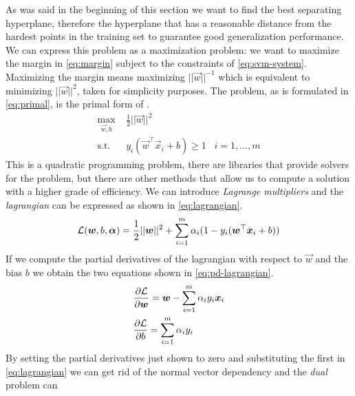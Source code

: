 As was said in the beginning of this section we want to find the best separating hyperplane,
therefore the hyperplane that has a reasonable distance from the hardest points in the training set
to guarantee good generalization performance. We can express this problem as a maximization problem:
we want to maximize the margin in \cref{eq:margin} subject to the constraints of
\cref{eq:svm-system}. Maximizing the margin means maximizing $||\vec{w}||^{-1}$ which is equivalent
to minimizing $||\vec{w}||^2$, taken for simplicity purposes. The problem, as is formulated in
\cref{eq:primal}, is the primal form of \svm.
\begin{equation}
	\label{eq:primal}
	\begin{aligned}
		\max_{\vec{w}, b} & \frac{1}{2}||\vec{w}||^2                                                   \\
		 \text{s.t.}\hspace{10pt} & y_i(\vec{w}^\top\vec{x}_i + b) \geq 1 \hspace{10pt}i = 1, \ldots, m
	\end{aligned}
\end{equation}
This is a quadratic programming problem, there are libraries that provide solvers for the problem,
but there are other methods that allow us to compute a solution with a higher grade of efficiency.
We can introduce \emph{Lagrange multipliers} and the \emph{lagrangian} can be expressed as shown in
\cref{eq:lagrangian}.
\begin{equation}
	\label{eq:lagrangian}
	\mathcal{L}(\boldsymbol{w}, b, \boldsymbol{\alpha}) = \frac{1}{2} ||\boldsymbol{w}||^2 + \sum_{i = 1}^{m}{\alpha_i (1 - y_i(\boldsymbol{w}^\top\boldsymbol{x}_i + b))}
\end{equation}
If we compute the partial derivatives of the lagrangian with respect to $\vec{w}$ and the bias $b$
we obtain the two equations shown in \cref{eq:pd-lagrangian}.
\begin{equation}
	\label{eq:pd-lagrangian}
	\begin{aligned}
		 & \frac{\partial{\mathcal{L}}}{\partial{\boldsymbol{w}}} = \boldsymbol{w} - \sum_{i = 1}^m
		\alpha_iy_i\boldsymbol{x}_i                                                   \\
		 & \frac{\partial{\mathcal{L}}}{\partial{b}} = \sum_{i = 1}^m \alpha_iy_i
	\end{aligned}
\end{equation}
By setting the partial derivatives just shown to zero and substituting the first in
\cref{eq:lagrangian} we can get rid of the normal vector dependency and the \emph{dual} problem can
